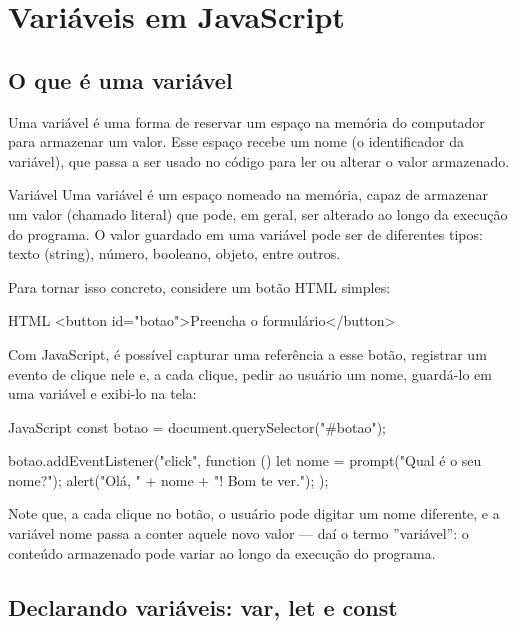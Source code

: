 \chapter{Variáveis em JavaScript}

\section{O que é uma variável}

Uma variável é uma forma de reservar um espaço na memória do computador para armazenar um valor. Esse espaço recebe um nome (o identificador da variável), que passa a ser usado no código para ler ou alterar o valor armazenado.

\begin{infobox}{Variável}
Uma variável é um espaço nomeado na memória, capaz de armazenar um valor (chamado literal) que pode, em geral, ser alterado ao longo da execução do programa. O valor guardado em uma variável pode ser de diferentes tipos: texto (string), número, booleano, objeto, entre outros.
\end{infobox}

Para tornar isso concreto, considere um botão HTML simples:

\begin{codebox}{HTML}
<button id="botao">Preencha o formulário</button>
\end{codebox}

Com JavaScript, é possível capturar uma referência a esse botão, registrar um evento de clique nele e, a cada clique, pedir ao usuário um nome, guardá-lo em uma variável e exibi-lo na tela:

\begin{codebox}{JavaScript}
const botao = document.querySelector("#botao");

botao.addEventListener("click", function () {
  let nome = prompt("Qual é o seu nome?");
  alert("Olá, " + nome + "! Bom te ver.");
});
\end{codebox}

Note que, a cada clique no botão, o usuário pode digitar um nome diferente, e a variável nome passa a conter aquele novo valor — daí o termo ”variável”: o conteúdo armazenado pode variar ao longo da execução do programa.

\section{Declarando variáveis: var, let e const}

